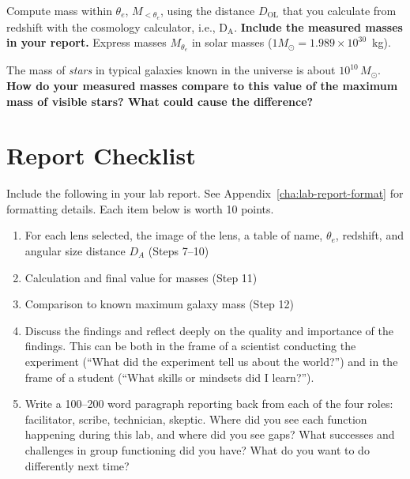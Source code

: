 \begin{steps}
	\item Compute mass within $\theta_e$, $M_{<\theta_e}$, using the distance $D_\textrm{OL}$
	that you calculate from redshift with the cosmology calculator,
	i.e., D$_\textrm{A}$.%
	\textbf{Include the measured masses in your
	report.} Express masses $M_{\theta_e}$ in solar masses ($1M_{\odot}=1.989\times 10^{30}$~kg).
	
	\item The mass of \textit{stars} in typical galaxies known in the
	universe is about $10^{10}\,M_{\odot}$. \textbf{How do your measured masses
	compare to this value of the maximum mass of visible stars? What
	could cause the difference?}
	
\end{steps}

%

\section{Report Checklist}

Include the following in your lab report. See Appendix~\ref{cha:lab-report-format} for formatting details. Each item below is worth 10 points.

\begin{enumerate}
	\item For each lens selected, the image of the lens, a table of name, $\theta_e$, redshift, and angular size distance $D_A$ (Steps 7--10)
	
	\item Calculation and final value for masses (Step 11)
	
	\item Comparison to known maximum galaxy mass (Step 12)
	
	\item Discuss the findings and reflect deeply on the quality and importance of the findings. This can
	be both in the frame of a scientist conducting the experiment (“What did the experiment tell us
	about the world?”) and in the frame of a student (“What skills or mindsets did I learn?”).
	
	\item Write a 100--200 word paragraph reporting back from each of the four roles: facilitator, scribe, technician, skeptic. Where did you see each function happening during this lab, and where did you see gaps? What successes and challenges in group functioning did you have? What do you want to do differently next time?
\end{enumerate}